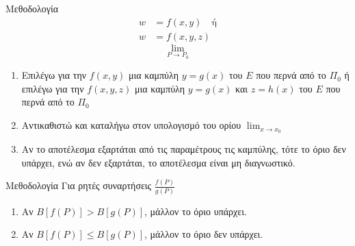 \documentclass[11pt,a4paper,titlepage,draft]{article}
\begin{document}
\begin{infobox}{Μεθοδολογία}
\begin{align*}
w&=f(x,y) \quad \text{ή}\\
w&=f(x,y,z)
\end{align*}
\[ \lim_{P\to P_0} \]
\tcblower
\begin{enumerate}
\item Επιλέγω για την \(f(x,y)\) μια καμπύλη \(y=g(x)\) του \(Ε\) που περνά από το \(Π_0\) ή \\ επιλέγω για την \(f(x,y,z)\) μια καμπύλη \(y=g(x)\) και \(z=h(x)\) του \(Ε\) που περνά από το \(Π_0\)
\item Αντικαθιστώ και καταλήγω στον υπολογισμό του ορίου \(\lim_{x \to x_0}\)
\item Αν το αποτέλεσμα εξαρτάται από τις παραμέτρους τις καμπύλης, τότε το όριο δεν υπάρχει, ενώ αν δεν εξαρτάται, το αποτέλεσμα είναι μη διαγνωστικό.
\end{enumerate}
\end{infobox}

\begin{infobox}{Μεθοδολογία}
Για ρητές συναρτήσεις \(\frac{f(P)}{g(P)}\)
\tcblower
\begin{enumerate}
\item Αν \(B \left[ f(P) \right] > B \left[ g(P) \right]\), μάλλον το όριο υπάρχει.
\item Αν \(B \left[ f(P) \right] \leq B \left[ g(P) \right]\), μάλλον το όριο δεν υπάρχει.
\end{enumerate}
\end{infobox}
\end{document}
